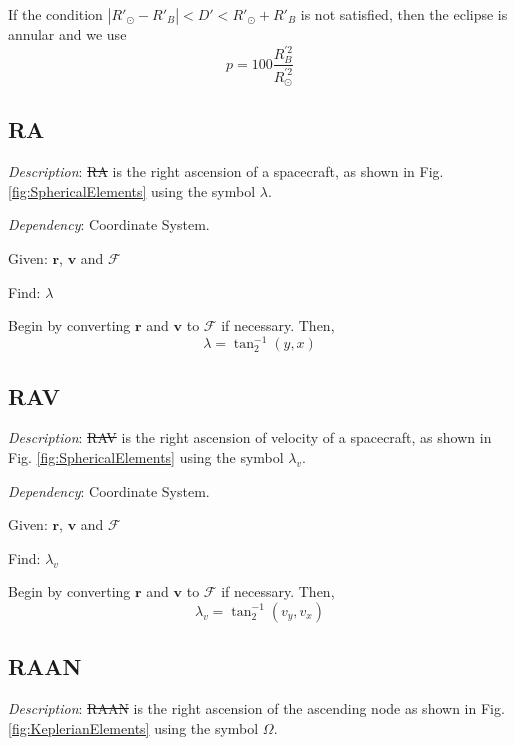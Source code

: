 If the condition $|R'_\odot - R'_B| < D' < R'_\odot + R'_B$ is not
satisfied, then the eclipse is annular and we use
%
\begin{equation}
     p = 100   \frac{R^{'\mbox{} 2}_B}{R^{'\mbox{} 2}_\odot}
\end{equation}


\subsection{RA}

\noindent \textit{Description}: \st{RA} is the right ascension of a
spacecraft, as shown in Fig. \ref{fig:SphericalElements} using the
symbol $\lambda$.

\noindent \textit{Dependency}:  Coordinate System.

\noindent Given:  $\mathbf{r}$, $\mathbf{v}$ and $\mathcal{F}$

\noindent Find:  $\lambda$

Begin by converting  $\mathbf{r}$ and $\mathbf{v}$ to  $\mathcal{F}$
if necessary.  Then,
%
\begin{equation}
    \lambda= \tan^{-1}_2(y,x)
\end{equation}

\subsection{RAV} 

\noindent \textit{Description}: \st{RAV} is the right ascension of
velocity of a spacecraft, as shown in Fig.
\ref{fig:SphericalElements} using the symbol $\lambda_v$.

\noindent \textit{Dependency}:  Coordinate System.

\noindent Given:  $\mathbf{r}$, $\mathbf{v}$ and $\mathcal{F}$

\noindent Find:  $\lambda_v$

Begin by converting  $\mathbf{r}$ and $\mathbf{v}$ to  $\mathcal{F}$
if necessary.  Then,
%
\begin{equation}
    \lambda_v= \tan^{-1}_2(v_y,v_x)
\end{equation}


\subsection{RAAN} 

\noindent \textit{Description}: \st{RAAN} is the right ascension of
the ascending node as shown in Fig. \ref{fig:KeplerianElements}
using the symbol $\Omega$.

